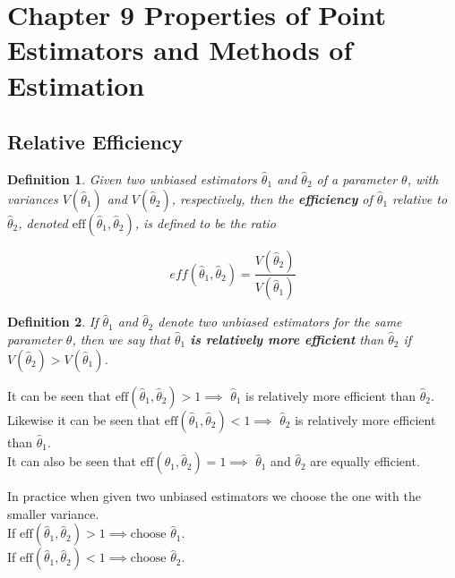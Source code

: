 \documentclass[a4paper,12pt]{article}
\theoremstyle{nonitalic}
\newtheorem{definition}{Definition}[subsection]
\begin{document}
    \newpage

    \section{Chapter 9 \textemdash{} Properties of Point Estimators and Methods of Estimation}

    \subsection{Relative Efficiency}
    
    \begin{definition}
        Given two unbiased estimators $\hat{\theta}_1$ and $\hat{\theta}_2$ of a parameter $\theta$, with variances $V(\hat{\theta}_1)$ and $V(\hat{\theta}_2)$, respectively, then the \textbf{efficiency} of $\hat{\theta}_1$ relative to $\hat{\theta}_2$, denoted $\text{eff}(\hat{\theta}_1, \hat{\theta}_2)$, is defined to be the ratio
            
        \[
            eff(\hat{\theta}_1, \hat{\theta}_2) = \frac{V(\hat{\theta}_2)}{V(\hat{\theta}_1)}
        \]
    \end{definition}

    \begin{definition}
        If $\hat{\theta}_1$ and $\hat{\theta}_2$ denote two unbiased estimators for the same parameter $\theta$, then we say that $\hat{\theta}_1$ \textbf{is relatively more efficient} than $\hat{\theta}_2$ if $V(\hat{\theta}_2) > V(\hat{\theta}_1)$.
    \end{definition}

    It can be seen that \(\text{eff}(\hat{\theta}_1, \hat{\theta}_2) > 1 \implies\) $\hat{\theta}_1$ is relatively more efficient than $\hat{\theta}_2$.\\
    Likewise it can be seen that \(\text{eff}(\hat{\theta}_1, \hat{\theta}_2) < 1 \implies\) $\hat{\theta}_2$ is relatively more efficient than $\hat{\theta}_1$.\\
    It can also be seen that \(\text{eff}(\hat{\theta}_1, \hat{\theta}_2) = 1 \implies\) $\hat{\theta}_1$ and $\hat{\theta}_2$ are equally efficient.

    \bigskip

    In practice when given two unbiased estimators we choose the one with the smaller variance.\\
    If \(\text{eff}(\hat{\theta}_1, \hat{\theta}_2) > 1 \implies \text{choose } \hat{\theta}_1.\)\\
    If \(\text{eff}(\hat{\theta}_1, \hat{\theta}_2) < 1 \implies \text{choose } \hat{\theta}_2.\)
\end{document}
